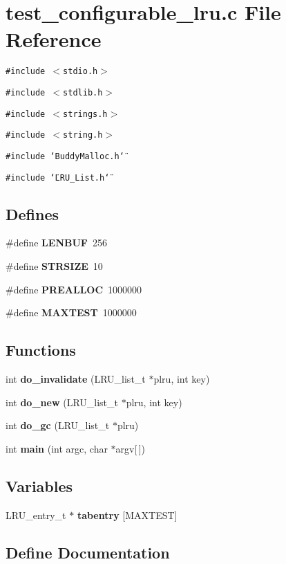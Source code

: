 \section{test\_\-configurable\_\-lru.c File Reference}
\label{test__configurable__lru_8c}
{\tt \#include $<$stdio.h$>$}\par
{\tt \#include $<$stdlib.h$>$}\par
{\tt \#include $<$strings.h$>$}\par
{\tt \#include $<$string.h$>$}\par
{\tt \#include \char`\"{}BuddyMalloc.h\char`\"{}}\par
{\tt \#include \char`\"{}LRU\_\-List.h\char`\"{}}\par
\subsection*{Defines}
\begin{CompactItemize}
\item 
\#define {\bf LENBUF}~256
\item 
\#define {\bf STRSIZE}~10
\item 
\#define {\bf PREALLOC}~1000000
\item 
\#define {\bf MAXTEST}~1000000
\end{CompactItemize}
\subsection*{Functions}
\begin{CompactItemize}
\item 
int {\bf do\_\-invalidate} (LRU\_\-list\_\-t $\ast$plru, int key)
\item 
int {\bf do\_\-new} (LRU\_\-list\_\-t $\ast$plru, int key)
\item 
int {\bf do\_\-gc} (LRU\_\-list\_\-t $\ast$plru)
\item 
int {\bf main} (int argc, char $\ast$argv[$\,$])
\end{CompactItemize}
\subsection*{Variables}
\begin{CompactItemize}
\item 
LRU\_\-entry\_\-t $\ast$ {\bf tabentry} [MAXTEST]
\end{CompactItemize}


\subsection{Define Documentation}
